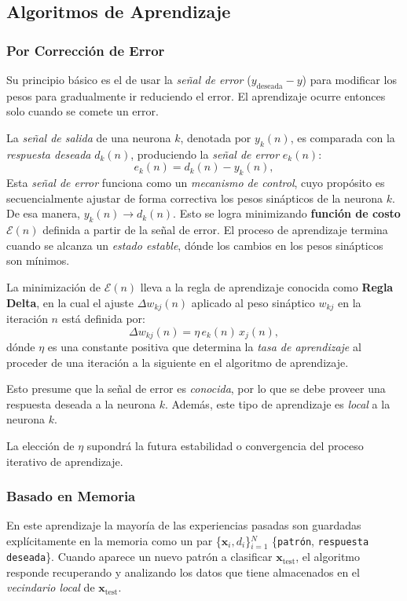 \documentclass[10pt,a4paper]{article}
\begin{document}
\subsection{Algoritmos de Aprendizaje}
\begin{multicols}{2}
\subsubsection{Por Corrección de Error}

Su principio básico es el de usar la \textit{señal de error} ($y_\text{deseada}-y$) para modificar los pesos para gradualmente ir reduciendo el error. El aprendizaje ocurre entonces solo cuando se comete un error.

La \textit{señal de salida} de una neurona $k$, denotada por $y_k(n)$, es comparada con la \textit{respuesta deseada} $d_k(n)$, produciendo la \textit{señal de error} $e_k(n)$:
\[e_k(n)=d_k(n) - y_k(n),\]
Esta \textit{señal de error} funciona como un \textit{mecanismo de control}, cuyo propósito es secuencialmente ajustar de forma correctiva los pesos sinápticos de la neurona $k$. De esa manera, $y_k(n) \rightarrow d_k(n)$. Esto se logra minimizando \textbf{función de costo} $\mathcal{E}(n)$ definida a partir de la señal de error. El proceso de aprendizaje termina cuando se alcanza un \textit{estado estable}, dónde los cambios en los pesos sinápticos son mínimos.

La minimización de $\mathcal{E}(n)$ lleva a la regla de aprendizaje conocida como \textbf{Regla Delta}, en la cual el ajuste $\Delta w_{kj}(n)$ aplicado al peso sináptico $w_{kj}$ en la iteración $n$ está definida por:
\[\Delta w_{kj}(n) = \eta \, e_k (n) \, x_j (n),\]
dónde $\eta$ es una constante positiva que determina la \textit{tasa de aprendizaje} al proceder de una iteración a la siguiente en el algoritmo de aprendizaje.

Esto presume que la señal de error es \textit{conocida}, por lo que se debe proveer una respuesta deseada a la neurona $k$. Además, este tipo de aprendizaje es \textit{local} a la neurona $k$.

La elección de $\eta$ supondrá la futura estabilidad o convergencia del proceso iterativo de aprendizaje.

\subsubsection{Basado en Memoria}

En este aprendizaje la mayoría de las experiencias pasadas son guardadas explícitamente en la memoria como un par \{$\mathbf{x}_i, d_i$\}$_{i=1}^N$ \{\texttt{patrón}, \texttt{respuesta deseada}\}. Cuando aparece un nuevo patrón a clasificar $\mathbf{x}_\text{test}$, el algoritmo responde recuperando y analizando los datos que tiene almacenados en el \textit{vecindario local} de $\mathbf{x}_\text{test}$.


\end{multicols}
\end{document}
